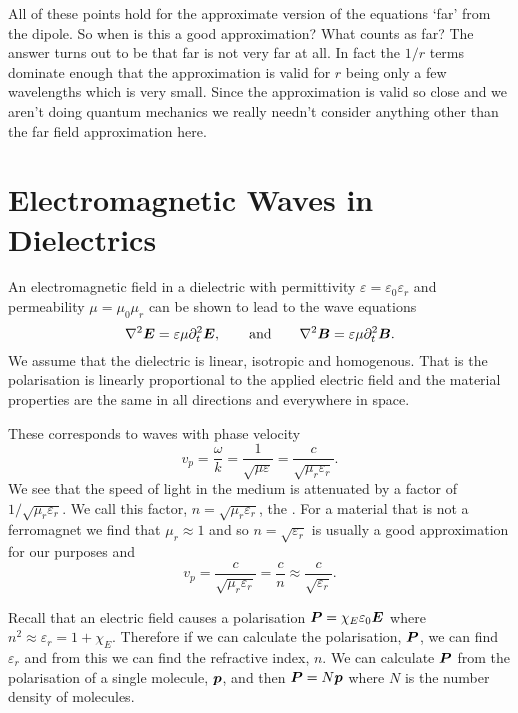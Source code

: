     All of these points hold for the approximate version of the equations `far' from the dipole.
    So when is this a good approximation?
    What counts as far?
    The answer turns out to be that far is not very far at all.
    In fact the \(1/r\) terms dominate enough that the approximation is valid for \(r\) being only a few wavelengths which is very small.
    Since the approximation is valid so close and we aren't doing quantum mechanics we really needn't consider anything other than the far field approximation here.
    
    \section{Electromagnetic Waves in Dielectrics}
    An electromagnetic field in a dielectric with permittivity \(\varepsilon = \varepsilon_0\varepsilon_r\) and permeability \(\mu = \mu_0\mu_r\) can be shown to lead to the wave equations
    \[\nabla^2\bm{E} = \varepsilon\mu\partial_t^2\bm{E}, \qquad\text{and}\qquad \nabla^2\bm{B} = \varepsilon\mu \partial_t^2\bm{B}.\]
    We assume that the dielectric is linear, isotropic and homogenous.
    That is the polarisation is linearly proportional to the applied electric field and the material properties are the same in all directions and everywhere in space.
    
    These corresponds to waves with phase velocity
    \[v_p = \frac{\omega}{k} = \frac{1}{\sqrt{\mu\varepsilon}} = \frac{c}{\sqrt{\mu_r\varepsilon_r}}.\]
    We see that the speed of light in the medium is attenuated by a factor of \(1/\sqrt{\mu_r\varepsilon_r}\).
    We call this factor, \(n = \sqrt{\mu_r\varepsilon_r}\), the .
    For a material that is not a ferromagnet we find that \(\mu_r \approx 1\) and so \(n = \sqrt{\varepsilon_r}\) is usually a good approximation for our purposes and
    \[v_p = \frac{c}{\sqrt{\mu_r\varepsilon_r}} = \frac{c}{n} \approx \frac{c}{\sqrt{\varepsilon_r}}.\]
    
    Recall that an electric field causes a polarisation \(\bm{P} = \chi_E\varepsilon_0\bm{E}\) where \(n^2 \approx \varepsilon_r = 1 + \chi_E\).
    Therefore if we can calculate the polarisation, \(\bm{P}\), we can find \(\varepsilon_r\) and from this we can find the refractive index, \(n\).
    We can calculate \(\bm{P}\) from the polarisation of a single molecule, \(\bm{p}\), and then \(\bm{P} = N\bm{p}\) where \(N\) is the number density of molecules.
    
